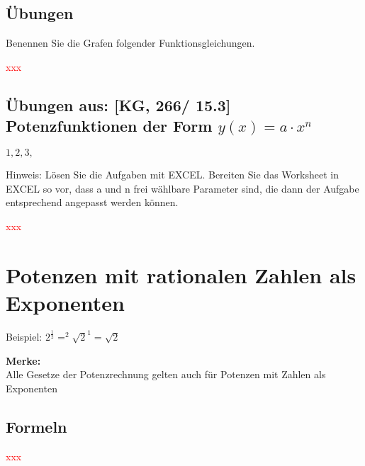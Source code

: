 \documentclass[11pt, a4paper, twoside, fleqn]{article}
\begin{document}
\subsection{Übungen}
\begin{flushleft}
Benennen Sie die Grafen folgender Funktionsgleichungen.
\end{flushleft}
\noindent \textcolor{red}{xxx}
\subsection{ Übungen aus: [KG, 266/ 15.3] Potenzfunktionen der Form \(y(x) = a \cdot x^{n}\)}
\( 1, 2, 3,\)
\begin{flushleft}
Hinweis: Lösen Sie die Aufgaben mit EXCEL. Bereiten Sie das Worksheet in EXCEL so vor, dass a und n frei wählbare Parameter sind, die dann der Aufgabe entsprechend angepasst werden können.
\end{flushleft}
\noindent \textcolor{red}{xxx}
\newpage
\section{Potenzen mit rationalen Zahlen als Exponenten}
\begin{flushleft}
Beispiel: \({2}^{\frac{1}{2}} = ^{2}\sqrt{2}^1 = \sqrt{2}\) 
\end{flushleft} 
\begin{flushleft}
\textbf{Merke:} \\
Alle Gesetze der Potenzrechnung gelten auch für Potenzen mit Zahlen als Exponenten
\end{flushleft}
\subsection{Formeln}
\textcolor{red}{xxx}
\end{document}
